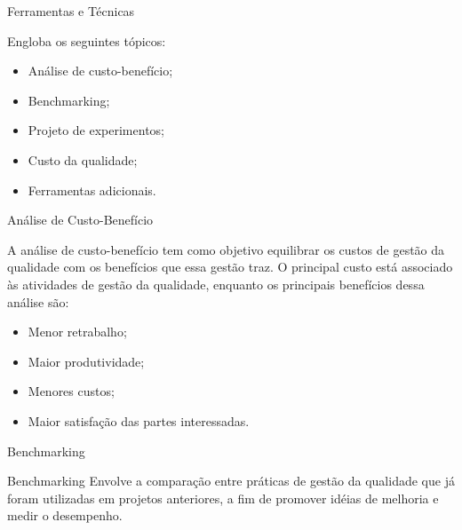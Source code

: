 \documentclass[xcolor=x11names,compress]{beamer}
\begin{document}
\begin{frame}{Ferramentas e Técnicas}

Engloba os seguintes tópicos:

\begin{itemize}

\itemsep 5mm

\item Análise de custo-benefício;

\item Benchmarking; 

\item Projeto de experimentos;

\item Custo da qualidade;

\item Ferramentas adicionais.
 
\end{itemize}

\end{frame}

\begin{frame}{Análise de Custo-Benefício}

A análise de custo-benefício tem como objetivo equilibrar os custos de gestão da qualidade com os benefícios que essa gestão traz. O principal custo está associado às atividades de gestão da qualidade, enquanto os principais benefícios dessa análise são:

\begin{itemize}

\itemsep 3mm

\item Menor retrabalho;

\item Maior produtividade;

\item Menores custos;

\item Maior satisfação das partes interessadas.

\end{itemize}

\end{frame}

\begin{frame}{Benchmarking}

\begin{alertblock}{Benchmarking}
Envolve a comparação entre práticas de gestão da qualidade que já foram utilizadas em projetos anteriores, a fim de promover idéias de melhoria e medir o desempenho.
\end{alertblock}

\end{frame}
\end{document}
